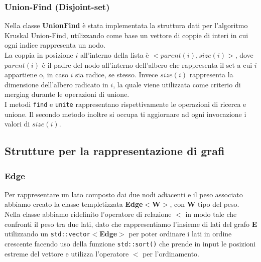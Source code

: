 \documentclass[]{article}
\begin{document}
\subsubsection{Union-Find (Disjoint-set)}
Nella classe \textbf{UnionFind} è stata implementata la struttura dati per l'algoritmo Kruskal Union-Find, utilizzando come base un vettore di coppie di interi in cui ogni indice rappresenta un nodo.\\
La coppia in posizione $i$ all'interno della lista è $<parent(i), size(i)>$, dove $parent(i)$ è il padre del nodo all'interno dell'albero che rappresenta il set a cui $i$ appartiene o, in caso $i$ sia radice, se stesso. Invece $size(i)$ rappresenta la dimensione dell'albero radicato in $i$, la quale viene utilizzata come criterio di merging durante le operazioni di unione.\\
I metodi \verb|find| e \verb|unite| rappresentano rispettivamente le operazioni di ricerca e unione. Il secondo metodo inoltre si occupa ti aggiornare ad ogni invocazione i valori di $size(i)$.
\newpage
\subsection{Strutture per la rappresentazione di grafi}
\subsubsection{Edge}
Per rappresentare un lato composto dai due nodi adiacenti e il peso associato abbiamo creato la classe templetizzata \textbf{Edge$<$W$>$}, con \textbf{W} tipo del peso.\\
Nella classe abbiamo ridefinito l'operatore di relazione \textbf{$<$} in modo tale che confronti il peso tra due lati, dato che rappresentiamo l'insieme di lati del grafo \textbf{E} utilizzando un \verb|std::vector|$<$\textbf{Edge}$>$ per poter ordinare i lati in ordine crescente facendo uso della funzione \verb|std::sort()| che prende in input le posizioni estreme del vettore e utilizza l'operatore \textbf{$<$} per l'ordinamento.
\end{document}
